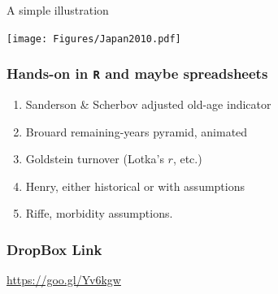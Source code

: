 \documentclass[20pt]{beamer}
\begin{document}
\begin{frame}{A simple illustration}
\begin{center}
 \texttt{[image: Figures/Japan2010.pdf]}
\end{center}
\end{frame}

\begin{frame}
\frametitle{Hands-on in \texttt{R} and maybe spreadsheets}
\begin{enumerate}
  \item Sanderson \& Scherbov adjusted old-age indicator
  \item Brouard remaining-years pyramid, animated
  \item Goldstein turnover (Lotka's $r$, etc.)
  \item Henry, either historical or with assumptions
  \item Riffe, morbidity assumptions.
\end{enumerate}
\end{frame}

\begin{frame}
\frametitle{DropBox Link}
\url{https://goo.gl/Yv6kgw}
\end{frame}


\end{document}
